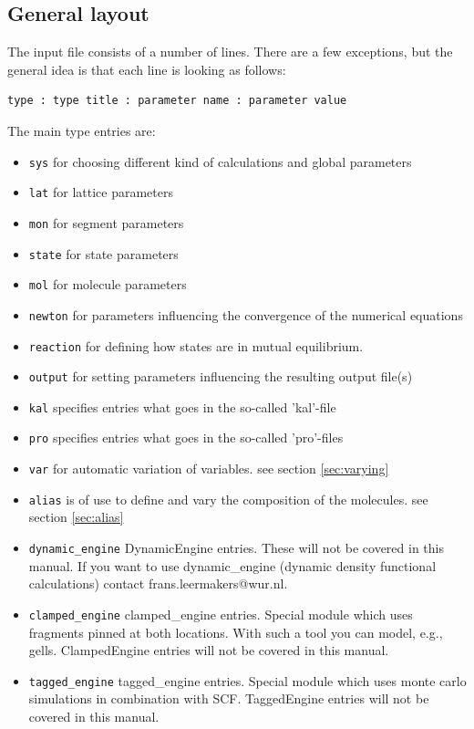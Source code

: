 \documentclass{article}
\begin{document}
\subsection{General layout}
The input file consists of a number of lines. There are a few exceptions, but the general idea is that each line is looking as follows:
\begin{verbatim}
type : type title : parameter name : parameter value 
\end{verbatim}
The main type entries are:
\begin{itemize}
\item \texttt{sys} for choosing different kind of calculations and global parameters
\item \texttt{lat} for lattice parameters 
\item \texttt{mon} for segment parameters
\item \texttt{state} for state parameters
\item \texttt{mol} for molecule parameters 
\item \texttt{newton} for parameters influencing the convergence of the numerical equations
\item \texttt{reaction} for defining how states are in mutual equilibrium.
\item \texttt{output} for setting parameters influencing the resulting output file(s)
\item \texttt{kal} specifies entries what goes in the so-called 'kal'-file
\item \texttt{pro} specifies entries what goes in the so-called 'pro'-files
\item \texttt{var} for automatic variation of variables. see section \ref{sec:varying}
\item \texttt{alias} is of use to define and vary the composition of the molecules. see section \ref{sec:alias}
\item \texttt{dynamic_engine} DynamicEngine entries. These will not be covered in this manual. If you want to use dynamic_engine (dynamic density functional calculations) contact frans.leermakers@wur.nl.
\item \texttt{clamped_engine} clamped_engine entries. Special module which uses fragments pinned at both locations. With such a tool you can model, e.g., gells. ClampedEngine entries will not be covered in this manual.
\item \texttt{tagged_engine} tagged_engine entries. Special module which uses monte carlo simulations in combination with SCF. TaggedEngine entries will not be covered in this manual.
\end{itemize}
\end{document}

